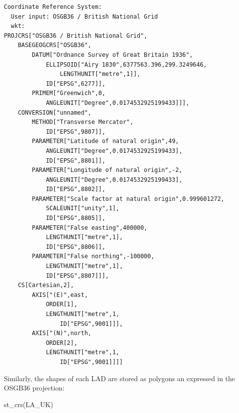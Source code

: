 \documentclass[
  letterpaper,
  DIV=11,
  numbers=noendperiod]{scrreprt}
\newenvironment{Shaded}{\begin{snugshade}}{\end{snugshade}}
\newcommand{\FunctionTok}[1]{\textcolor[rgb]{0.28,0.35,0.67}{#1}}
\newcommand{\NormalTok}[1]{\textcolor[rgb]{0.00,0.23,0.31}{#1}}
\begin{document}
\begin{verbatim}
Coordinate Reference System:
  User input: OSGB36 / British National Grid 
  wkt:
PROJCRS["OSGB36 / British National Grid",
    BASEGEOGCRS["OSGB36",
        DATUM["Ordnance Survey of Great Britain 1936",
            ELLIPSOID["Airy 1830",6377563.396,299.3249646,
                LENGTHUNIT["metre",1]],
            ID["EPSG",6277]],
        PRIMEM["Greenwich",0,
            ANGLEUNIT["Degree",0.0174532925199433]]],
    CONVERSION["unnamed",
        METHOD["Transverse Mercator",
            ID["EPSG",9807]],
        PARAMETER["Latitude of natural origin",49,
            ANGLEUNIT["Degree",0.0174532925199433],
            ID["EPSG",8801]],
        PARAMETER["Longitude of natural origin",-2,
            ANGLEUNIT["Degree",0.0174532925199433],
            ID["EPSG",8802]],
        PARAMETER["Scale factor at natural origin",0.999601272,
            SCALEUNIT["unity",1],
            ID["EPSG",8805]],
        PARAMETER["False easting",400000,
            LENGTHUNIT["metre",1],
            ID["EPSG",8806]],
        PARAMETER["False northing",-100000,
            LENGTHUNIT["metre",1],
            ID["EPSG",8807]]],
    CS[Cartesian,2],
        AXIS["(E)",east,
            ORDER[1],
            LENGTHUNIT["metre",1,
                ID["EPSG",9001]]],
        AXIS["(N)",north,
            ORDER[2],
            LENGTHUNIT["metre",1,
                ID["EPSG",9001]]]]
\end{verbatim}

Similarly, the shapes of each LAD are stored as polygons an expressed in
the OSGB36 projection:

\begin{Shaded}
\begin{Highlighting}[]
\FunctionTok{st\_crs}\NormalTok{(LA\_UK)}
\end{Highlighting}
\end{Shaded}
\end{document}
